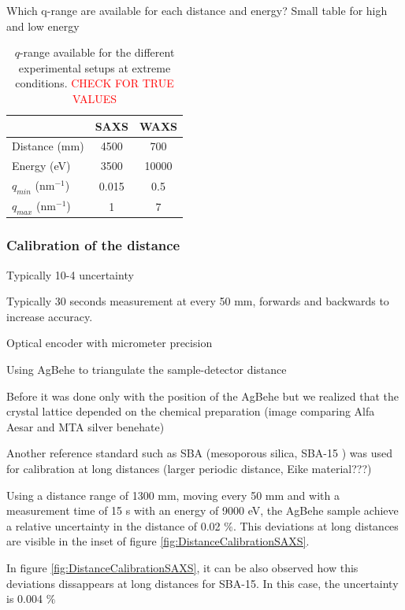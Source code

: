 Which q-range are available for each distance and energy? Small table for high and low energy

\begin{table}[]
\centering
\caption{$q$-range available for the different experimental setups at extreme conditions. \textcolor{red}{CHECK FOR TRUE VALUES}}
\label{tab:qrange}
\begin{tabular}{|l|c|c|}
\hline
              & \textbf{SAXS} & \textbf{WAXS} \\ \hline
Distance (mm) & 4500          & 700           \\ \hline
Energy (eV)   & 3500          & 10000         \\ \hline
$q_{min}$ (nm$^{-1}$)   & 0.015         & 0.5           \\ \hline
$q_{max}$ (nm$^{-1}$)   & 1             & 7             \\ \hline
\end{tabular}
\end{table}


\subsubsection{Calibration of the distance}

Typically 10-4 uncertainty

Typically 30 seconds measurement at every 50 mm, forwards and backwards to increase accuracy.

Optical encoder with micrometer precision

Using AgBehe to triangulate the sample-detector distance

Before it was done only with the position of the AgBehe but we realized that the crystal lattice depended on the chemical preparation (image comparing Alfa Aesar and MTA silver benehate)

Another reference standard such as SBA (mesoporous silica, SBA-15 \cite{zhao_triblock_1998}) was used for calibration at long distances (larger periodic distance, Eike material???)

Using a distance range of 1300 mm, moving every 50 mm and with a measurement time of 15 s with an energy of 9000 eV, the AgBehe sample achieve a relative uncertainty in the distance of 0.02 $\%$. This deviations at long distances are visible in the inset of figure \ref{fig:DistanceCalibrationSAXS}.

In figure \ref{fig:DistanceCalibrationSAXS}, it can be also observed how this deviations dissappears at long distances for SBA-15. In this case, the uncertainty is 0.004 $\%$

